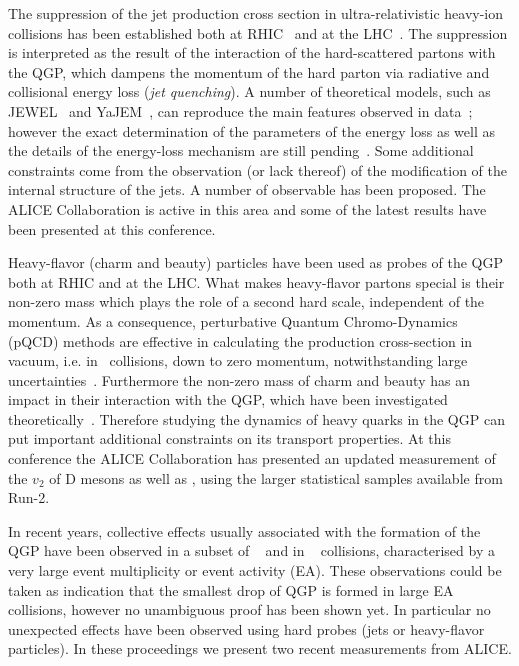 \documentclass[10pt]{article}
\begin{document}
The suppression of the jet production cross section in ultra-relativistic heavy-ion collisions has been established both at RHIC~\cite{STAR:2017a} and at the LHC~\cite{ALICE:2015a}. The suppression is interpreted as the result of the interaction of the hard-scattered partons 
with the QGP, which dampens the momentum of the hard parton via radiative and collisional energy loss (\emph{jet quenching}). A number of theoretical models, such as JEWEL~\cite{Zapp:2014} and YaJEM~\cite{Renk:2013}, can reproduce
the main features observed in data~\cite{ALICE:2015a}; however the exact determination of the parameters of the energy loss as well as the details of the energy-loss mechanism are still pending~\cite{Burke:2013}. Some additional constraints come from the observation (or lack thereof) of
the modification of the internal structure of the jets. A number of observable has been proposed. The ALICE Collaboration is active in this area and some of the latest results have been presented at this conference.

Heavy-flavor (charm and beauty) particles have been used as probes of the QGP both at RHIC and at the LHC. What makes heavy-flavor partons special is their non-zero mass which plays the role of a second hard scale, independent of the momentum.
As a consequence, perturbative Quantum Chromo-Dynamics (pQCD) methods are effective in calculating the production cross-section in vacuum, i.e. in \pp\ collisions, down to zero momentum, notwithstanding large uncertainties~\cite{ALICE:2017a}.
Furthermore the non-zero mass of charm and beauty has an impact in their interaction with the QGP, which have been investigated theoretically~\cite{Dokshitzer:2001}.
Therefore studying the dynamics of heavy quarks in the QGP can put important additional constraints on its transport properties.
At this conference the ALICE Collaboration has presented an updated measurement of the $v_2$ of D mesons as well as \jpsi, using the larger statistical samples available from Run-2.

In recent years, collective effects usually associated with the formation of the QGP have been observed in a subset of \pPb~\cite{CMS:2013b} and in \pp~\cite{ALICE:2017b} collisions, characterised by a very large event multiplicity or event activity (EA). These observations could be taken as indication that the smallest drop
of QGP is formed in large EA collisions, however no unambiguous proof has been shown yet. In particular no unexpected effects have been observed using hard probes (jets or heavy-flavor particles). In these proceedings we present two recent measurements from ALICE.
\end{document}
